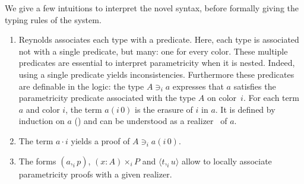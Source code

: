 \documentclass[english]{PaperTools/latex/entcs}
\theoremstyle{plain}
\theoremstyle{definition}
\theoremstyle{remark}
\newcommand\CP[3]{(#2,_{#1} #3)}
\newcommand\CTimes[2]{(#2) ×_{#1}}
\newcommand\param[1]{\!\cdot\!#1}
\newcommand\op[1]{∋_{#1}}
\newcommand\fp[3]{⟨#2 ,_{#1} #3⟩}
\newcommand\mor[2]{({#1}\,{#2})}
\newcommand\proj[2]{{#2}\mor{#1}0}
\begin{document}
We give a few intuitions to interpret the novel syntax, before formally giving the typing rules of the system.
\begin{enumerate}
\item Reynolds associates each type with a
  predicate. Here, each type is associated not with a single predicate, but
  many: one for every color.
  These multiple predicates are essential to interpret parametricity when
  it is nested.  Indeed, using a single predicate yields
  inconsistencies.
  Furthermore these predicates are definable
  in the logic: the type $A \op i a$ expresses that $a$ satisfies
  the parametricity predicate associated with the type $A$ on color~$i$.
  For each term $a$ and color $i$, the term $\proj i a$ is the erasure
  of $i$ in $a$.  It is defined by induction on $a$
  () and can be understood as a
  realizer~\cite{bernardy_realizability_2011} of $a$.
\item The term $a \param i$ yields a proof of $A \op i \proj i a$.
\item The forms $\CP i a p$, $\CTimes i {x:A} P$ and $\fp i t u$ allow to
  locally associate parametricity proofs with a given realizer.
\end{enumerate}
\end{document}
